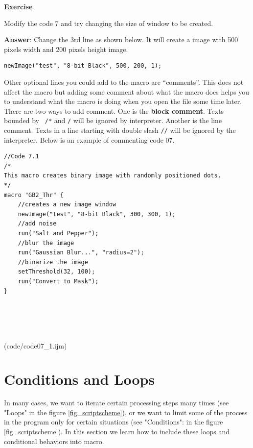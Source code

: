 \documentclass[11pt,a4paper,oneside]{report}
\newenvironment{indentexercise}[1]
{{\setlength{\leftmargin}{2em}}
\textbf{Exercise \thesubsection-#1}
\begin{list}{}
	\item
}
{\end{list}}
\newcommand{\ilcom}[1]{\texttt{\small#1}}
\begin{document}
\begin{indentexercise}{1}
Modify the code 7 and try changing the size of window to be created.

\item \textbf{Answer}: Change the 3rd line as shown below. It will create a image with 500 pixels width and 200 pixels height image.  
	\begin{lstlisting}[numbers=none]
		newImage("test", "8-bit Black", 500, 200, 1);
	\end{lstlisting}
\end{indentexercise}

Other optional lines you could add to the macro are ``comments''. This does not affect the macro but adding some comment about what the macro does helps you to understand what the macro is doing when you open the file some time later. There are two ways to add comment. One is the \textbf{block comment}. Texts bounded by \ilcom{ /*} and \ilcom{*/} will be ignored by interpreter. Another is the line comment. Texts in a line starting with double slash \ilcom{//} will be ignored by the interpreter. Below is an example of commenting code 07. 


\begin{lstlisting}
//Code 7.1
/*  
This macro creates binary image with randomly positioned dots.  
*/
macro "GB2_Thr" {
	//creates a new image window
	newImage("test", "8-bit Black", 300, 300, 1);
	//add noise
	run("Salt and Pepper");
	//blur the image
	run("Gaussian Blur...", "radius=2");
	//binarize the image
	setThreshold(32, 100);
	run("Convert to Mask");
}





\end{lstlisting}
(code/code07_1.ijm)
 
\newpage

\section{Conditions and Loops}
	In many cases, we want to iterate certain processing steps many times (see "Loops" in the figure \ref{fig_scriptscheme}), or we want to limit some of the process in the program only for certain situations (see "Conditions": in the figure \ref{fig_scriptscheme}). In this section we learn how to include these loops and conditional behaviors into macro. 
\end{document}
